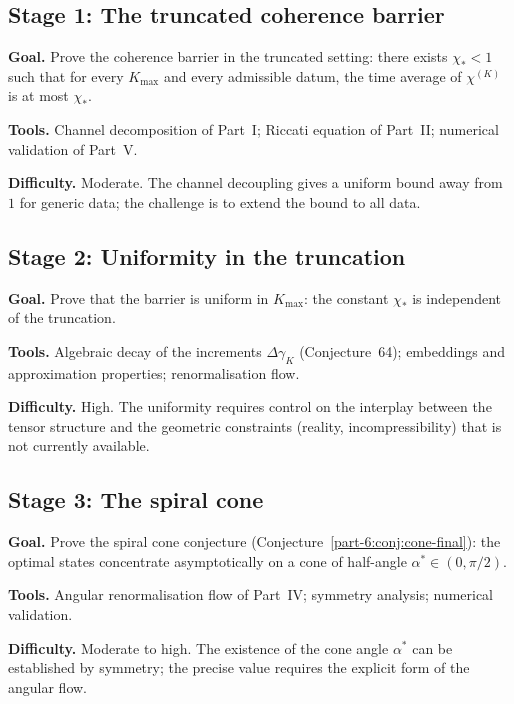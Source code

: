 \subsection{Stage 1: The truncated coherence barrier}
\label{part-6:ssec:stage-1}

\textbf{Goal.} Prove the coherence barrier in the truncated setting: 
there exists $\chi_\ast<1$ such that for every $K_{\max}$ and every 
admissible datum, the time average of $\chi^{(K)}$ is at most 
$\chi_\ast$.

\textbf{Tools.} Channel decomposition of Part~I; Riccati equation 
of Part~II; numerical validation of Part~V.

\textbf{Difficulty.} Moderate. The channel decoupling gives a 
uniform bound away from $1$ for generic data; the challenge is to 
extend the bound to all data.

\subsection{Stage 2: Uniformity in the truncation}
\label{part-6:ssec:stage-2}

\textbf{Goal.} Prove that the barrier is uniform in $K_{\max}$: the 
constant $\chi_\ast$ is independent of the truncation.

\textbf{Tools.} Algebraic decay of the increments $\Delta\gamma_K$ 
(Conjecture~64); embeddings and approximation properties; 
renormalisation flow.

\textbf{Difficulty.} High. The uniformity requires control on the 
interplay between the tensor structure and the geometric 
constraints (reality, incompressibility) that is not currently 
available.

\subsection{Stage 3: The spiral cone}
\label{part-6:ssec:stage-3}

\textbf{Goal.} Prove the spiral cone conjecture 
(Conjecture~\ref{part-6:conj:cone-final}): the optimal states concentrate 
asymptotically on a cone of half-angle $\alpha^\ast\in(0,\pi/2)$.

\textbf{Tools.} Angular renormalisation flow of Part~IV; symmetry 
analysis; numerical validation.

\textbf{Difficulty.} Moderate to high. The existence of the cone 
angle $\alpha^\ast$ can be established by symmetry; the precise 
value requires the explicit form of the angular flow.


